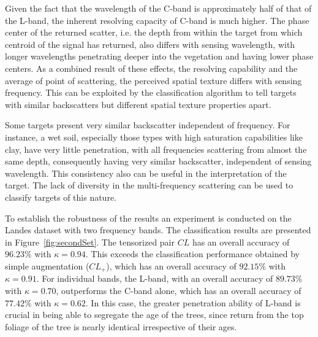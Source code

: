 Given the fact that the wavelength of the C-band is approximately half of that of the L-band, the inherent resolving capacity of C-band is much higher. The phase center of the returned scatter, i.e. the depth from within the target from which centroid of the signal has returned, also differs with sensing wavelength, with longer wavelengths penetrating deeper into the vegetation and having lower phase centers. As a combined result of these effects, the resolving capability and the average of point of scattering, the perceived spatial texture differs with sensing frequency. This can be exploited by the classification algorithm to tell targets with similar backscatters but different spatial texture properties apart.

Some targets present very similar backscatter independent of frequency. For instance, a wet soil, especially those types with high saturation capabilities like clay, have very little penetration, with all frequencies scattering from almost the same depth, consequently having very similar backscatter, independent of sensing wavelength. This consistency also can be useful in the interpretation of the target. The lack of diversity in the multi-frequency scattering can be used to classify targets of this nature. 



To establish the robustness of the results an experiment is conducted on the Landes dataset with two frequency bands. The classification results are presented in Figure~\ref{fig:secondSet}. 
The tensorized pair $CL$ has an overall accuracy of $96.23\%$ with $\kappa=0.94$. This exceeds the classification performance obtained by simple augmentation ($CL_+$), which has an overall accuracy of $92.15\%$ with $\kappa=0.91$. For individual bands, the L-band, with an overall accuracy of  $89.73\%$ with $\kappa=0.70$, outperforms the C-band alone, which has an overall accuracy of  $77.42\%$ with $\kappa=0.62$. In this case, the greater penetration ability of L-band is crucial in being able to segregate the age of the trees, since return from the top foliage of the tree is nearly identical irrespective of their ages. 

